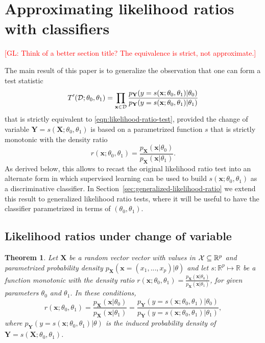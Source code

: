 \documentclass[12pt]{article}
\numberwithin{equation}{section}
\theoremstyle{plain}
\newtheorem{theorem}{Theorem}
\newcommand{\glnote}[1]{\textcolor{red}{[GL: #1]}}
\begin{document}
\section{Approximating likelihood ratios with classifiers}
\label{sec:approx}

\glnote{Think of a better section title? The equivalence is strict, not approximate.}

The main result of this paper is to generalize the observation that one can
form a test statistic
\begin{equation}\label{eqn:likelihood-ratio-test-equiv}
T'({\cal D}; \theta_0, \theta_1) = \prod_{\mathbf{x} \in {\cal D}} \frac{ p_\mathbf{Y}(y=s(\mathbf{x}; \theta_0, \theta_1) | \theta_0)}{ p_\mathbf{Y}(y=s(\mathbf{x}; \theta_0, \theta_1) | \theta_1)}
\end{equation}
that is strictly equivalent to \ref{eqn:likelihood-ratio-test}, provided the change
of variable $\mathbf{Y} = s(\mathbf{X}; \theta_0, \theta_1)$ is based
on a parametrized function $s$ that is strictly monotonic with the density ratio
\begin{equation}
r(\mathbf{x};\theta_0, \theta_1) = \frac{p_\mathbf{X}(\mathbf{x}|\theta_0)}{p_\mathbf{X}(\mathbf{x}|\theta_1)}.
\end{equation}
As derived below, this allows to recast the original likelihood ratio test into an alternate
form in which supervised learning can be used to build
$s(\mathbf{x}; \theta_0, \theta_1)$ as a discriminative classifier.  In
Section~\ref{sec:generalized-likelihood-ratio} we extend this result to generalized likelihood ratio tests,
where it will be useful to have the classifier  parametrized in terms of
$(\theta_0, \theta_1)$.

\subsection{Likelihood ratios under change of variable}

\begin{theorem}
    \label{thm:ratio-equivalence}
    Let $\mathbf{X}$ be a random vector vector with values in ${\cal X} \subseteq \mathbb{R}^p$ and parametrized probability
    density $p_{\mathbf{X}}(\mathbf{x} = (x_1, ..., x_p)|\theta)$ and let
    $s : \mathbb{R}^p \mapsto \mathbb{R}$ be a function monotonic with the density ratio
    $r(\mathbf{x};\theta_0,\theta_1) = \frac{p_\mathbf{X}(\mathbf{x}|\theta_0)}{p_\mathbf{X}(\mathbf{x}|\theta_1)}$,
    for given parameters $\theta_0$ and $\theta_1$. In these conditions,
    \begin{equation}
        r(\mathbf{x};\theta_0,\theta_1) = \frac{p_\mathbf{X}(\mathbf{x}|\theta_0)}{p_\mathbf{X}(\mathbf{x}|\theta_1)} = \frac{p_\mathbf{Y}(y=s(\mathbf{x};\theta_0,\theta_1)|\theta_0)}{p_\mathbf{Y}(y=s(\mathbf{x};\theta_0,\theta_1)|\theta_1)},
    \end{equation}
    where $p_\mathbf{Y}(y=s(\mathbf{x};\theta_0,\theta_1)|\theta)$ is the induced probability density of
    $\mathbf{Y} = s(\mathbf{X};\theta_0,\theta_1)$.
\end{theorem}
\end{document}
